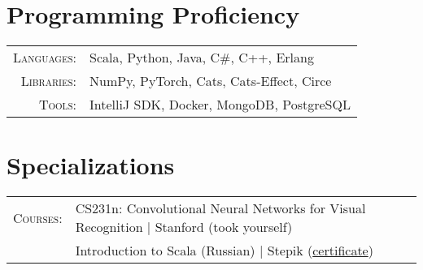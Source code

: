 \documentclass[a4paper,11pt]{article}
\begin{document}
\section{Programming Proficiency}
\begin{tabular}{rl}
  \textsc{Languages:}& Scala, Python, Java, C\#, C++, Erlang\\
  \textsc{Libraries:}& NumPy, PyTorch, Cats, Cats-Effect, Circe\\
  \textsc{Tools:}& IntelliJ SDK, Docker, MongoDB, PostgreSQL\\
\end{tabular}

\section{Specializations}
\begin{tabular}{rl}
  \textsc{Courses:}
  &CS231n: Convolutional Neural Networks for Visual Recognition | Stanford (took yourself)\\
  &Introduction to Scala (Russian) | Stepik (\href{https://stepik.org/cert/204169}{certificate})
\end{tabular}
\end{document}
